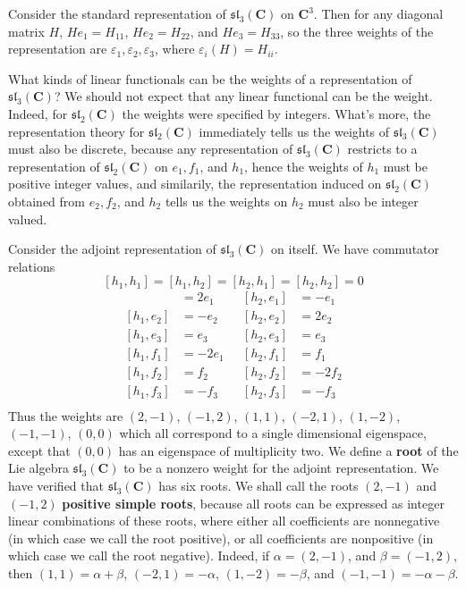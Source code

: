 \begin{example}
    Consider the standard representation of $\mathfrak{sl}_3(\mathbf{C})$ on $\mathbf{C}^3$. Then for any diagonal matrix $H$, $He_1 = H_{11}$, $He_2 = H_{22}$, and $He_3 = H_{33}$, so the three weights of the representation are $\varepsilon_1, \varepsilon_2, \varepsilon_3$, where $\varepsilon_i(H) = H_{ii}$.
\end{example}

What kinds of linear functionals can be the weights of a representation of $\mathfrak{sl}_3(\mathbf{C})$? We should not expect that any linear functional can be the weight. Indeed, for $\mathfrak{sl}_2(\mathbf{C})$ the weights were specified by integers. What's more, the representation theory for $\mathfrak{sl}_2(\mathbf{C})$ immediately tells us the weights of $\mathfrak{sl}_3(\mathbf{C})$ must also be discrete, because any representation of $\mathfrak{sl}_3(\mathbf{C})$ restricts to a representation of $\mathfrak{sl}_2(\mathbf{C})$ on $e_1, f_1$, and $h_1$, hence the weights of $h_1$ must be positive integer values, and similarily, the representation induced on $\mathfrak{sl}_2(\mathbf{C})$ obtained from $e_2, f_2$, and $h_2$ tells us the weights on $h_2$ must also be integer valued.

\begin{example}
    Consider the adjoint representation of $\mathfrak{sl}_3(\mathbf{C})$ on itself. We have commutator relations
    \[ [h_1,h_1] = [h_1,h_2] = [h_2,h_1] = [h_2,h_2] = 0 \]
    \begin{align*}
        [h_1,e_1] &= 2e_1\ \ \ &[h_2, e_1] &= -e_1\\
        [h_1,e_2] &= -e_2\ \ \ &[h_2, e_2] &= 2e_2\\
        [h_1,e_3] &= e_3\ \ \ &[h_2, e_3] &= e_3\\
        [h_1,f_1] &= -2e_1\ \ \ &[h_2,f_1] &= f_1\\
        [h_1,f_2] &= f_2\ \ \ &[h_2, f_2] &= -2f_2\\
        [h_1,f_3] &= -f_3\ \ \ &[h_2, f_3] &= -f_3\\
    \end{align*}
    Thus the weights are $(2,-1)$, $(-1,2)$, $(1,1)$, $(-2,1)$, $(1,-2)$, $(-1,-1)$, $(0,0)$ which all correspond to a single dimensional eigenspace, except that $(0,0)$ has an eigenspace of multiplicity two. We define a {\bf root} of the Lie algebra $\mathfrak{sl}_3(\mathbf{C})$ to be a nonzero weight for the adjoint representation. We have verified that $\mathfrak{sl}_3(\mathbf{C})$ has six roots. We shall call the roots $(2,-1)$ and $(-1,2)$ {\bf positive simple roots}, because all roots can be expressed as integer linear combinations of these roots, where either all coefficients are nonnegative (in which case we call the root positive), or all coefficients are nonpositive (in which case we call the root negative). Indeed, if $\alpha = (2,-1)$, and $\beta = (-1,2)$, then $(1,1) = \alpha + \beta$, $(-2,1) = -\alpha$, $(1,-2) = -\beta$, and $(-1,-1) = -\alpha - \beta$.
\end{example}

